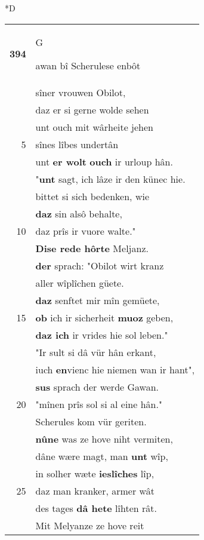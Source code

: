 \documentclass[8pt,a4paper,notitlepage]{article}
\begin{document}
\begin{table}[ht]
\begin{minipage}[t]{0.5\linewidth}
\small
\begin{center}*D
\end{center}
\begin{tabular}{rl}
\textbf{394} & \begin{large}G\end{large}awan bî Scherulese enbôt\\ 
 & sîner vrouwen Obilot,\\ 
 & daz er si gerne wolde sehen\\ 
 & unt ouch mit wârheite jehen\\ 
5 & sînes lîbes undertân\\ 
 & unt \textbf{er wolt} \textbf{ouch} ir urloup hân.\\ 
 & "\textbf{unt} sagt, ich lâze ir den künec hie.\\ 
 & bittet si sich bedenken, wie\\ 
 & \textbf{daz} sin alsô behalte,\\ 
10 & daz prîs ir vuore walte."\\ 
 & \textbf{Dise rede hôrte} Meljanz.\\ 
 & \textbf{der} sprach: "Obilot wirt kranz\\ 
 & aller wîplîchen güete.\\ 
 & \textbf{daz} senftet mir mîn gemüete,\\ 
15 & \textbf{ob} ich ir sicherheit \textbf{muoz} geben,\\ 
 & \textbf{daz ich} ir vrides hie sol leben."\\ 
 & "Ir sult si dâ vür hân erkant,\\ 
 & iuch \textbf{en}vienc hie niemen wan ir hant",\\ 
 & \textbf{sus} sprach der werde Gawan.\\ 
20 & "mînen prîs sol si al eine hân."\\ 
 & Scherules kom vür geriten.\\ 
 & \textbf{nû}\textbf{ne} was ze hove niht vermiten,\\ 
 & dâne wære magt, man \textbf{unt} wîp,\\ 
 & in solher wæte \textbf{ieslîches} lîp,\\ 
25 & daz man kranker, armer wât\\ 
 & des tages \textbf{dâ hete} lîhten rât.\\ 
 & Mit Melyanze ze hove reit\\ 

\end{tabular}
\end{minipage}
\end{table}
\end{document}
